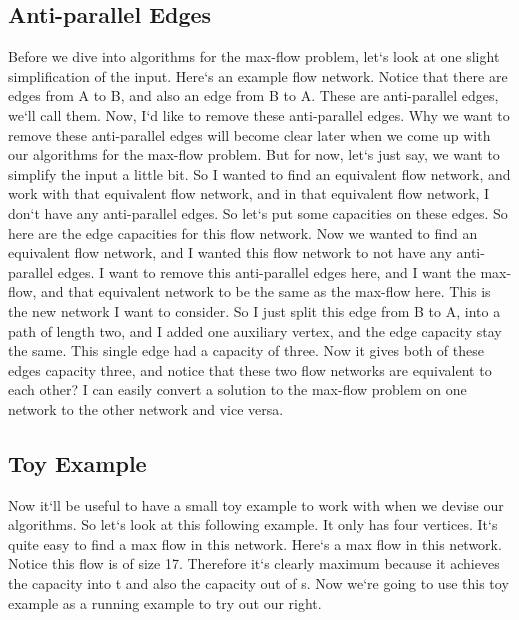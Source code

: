\subsection{Anti-parallel Edges}
Before we dive into algorithms for the max-flow problem, let`s look at one slight simplification of the input.
Here`s an example flow network.
Notice that there are edges from A to B, and also an edge from B to A\@.
These are anti-parallel edges, we`ll call them.
Now, I`d like to remove these anti-parallel edges.
Why we want to remove these anti-parallel edges will become clear later when we come up with our algorithms for the max-flow problem.
But for now, let`s just say, we want to simplify the input a little bit.
So I wanted to find an equivalent flow network, and work with that equivalent flow network, and in that equivalent flow network, I don`t have any anti-parallel edges.
So let`s put some capacities on these edges.
So here are the edge capacities for this flow network.
Now we wanted to find an equivalent flow network, and I wanted this flow network to not have any anti-parallel edges.
I want to remove this anti-parallel edges here, and I want the max-flow, and that equivalent network to be the same as the max-flow here.
This is the new network I want to consider.
So I just split this edge from B to A, into a path of length two, and I added one auxiliary vertex, and the edge capacity stay the same.
This single edge had a capacity of three.
Now it gives both of these edges capacity three, and notice that these two flow networks are equivalent to each other? I can easily convert a solution to the max-flow problem on one network to the other network and vice versa.

\subsection{Toy Example}
Now it`ll be useful to have a small toy example to work with when we devise our algorithms.
So let`s look at this following example.
It only has four vertices.
It`s quite easy to find a max flow in this network.
Here`s a max flow in this network.
Notice this flow is of size 17.
Therefore it`s clearly maximum because it achieves the capacity into t and also the capacity out of s.
Now we`re going to use this toy example as a running example to try out our right.

